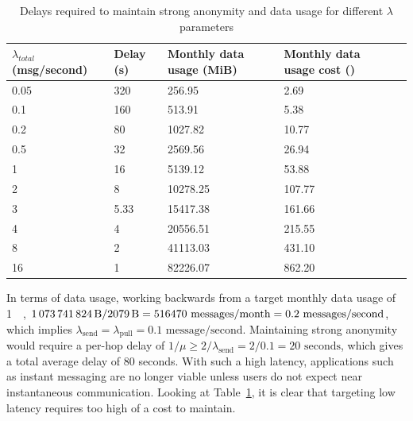 \documentclass[final,dissertation.tex]{subfiles}
\begin{document}
\begin{table}[h]
	\centering
	\begin{tabular}{@{}lllll@{}}
		\toprule
		$\lambda_{total}$ (msg/second) & Delay (s) & Monthly data usage (MiB) & Monthly data usage cost (\textsterling) &  \\ \midrule
		0.05              & 320       & 256.95                   & 2.69                      &  \\
		0.1               & 160       & 513.91                   & 5.38                      &  \\
		0.2               & 80        & 1027.82                  & 10.77                     &  \\
		0.5               & 32        & 2569.56                  & 26.94                     &  \\
		1                 & 16        & 5139.12                  & 53.88                     &  \\
		2                 & 8         & 10278.25                 & 107.77                    &  \\
		3                 & 5.33      & 15417.38                 & 161.66                    &  \\
		4                 & 4         & 20556.51                 & 215.55                    &  \\
		8                 & 2         & 41113.03                 & 431.10                    &  \\
		16                & 1         & 82226.07                 & 862.20                    &  \\ \bottomrule
	\end{tabular}
	\caption{Delays required to maintain strong anonymity and data usage for different $\lambda$ parameters}
	\label{table:tuning}
\end{table}

In terms of data usage, working backwards from a target monthly data usage of \SI{1}{\gibi\byte}, $\SI{1073741824}{\byte}/\SI{2079}{\byte} = 516470 \text{ messages}/\text{month} = 0.2\text{ messages}/\text{second}$, which implies $\lambda_\text{send} = \lambda_\text{pull} = 0.1 \text{ message/second}$. Maintaining strong anonymity would require a per-hop delay of $1/\mu \ge 2/\lambda_\text{send} = 2/0.1 = 20 \text{ seconds}$, which gives a total average delay of 80 seconds. With such a high latency, applications such as instant messaging are no longer viable unless users do not expect near instantaneous communication. Looking at Table~\ref{table:tuning}, it is clear that targeting low latency requires too high of a cost to maintain.
\end{document}
